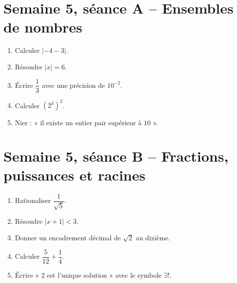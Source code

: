 \section{Semaine 5, séance A -- Ensembles de nombres}
\begin{enumerate}
  \item Calculer $|{-4}-3|$.
  \item Résoudre $|x|=6$.
  \item Écrire $\dfrac13$ avec une précision de $10^{-2}$.
  \item Calculer $(2^3)^2$.
  \item Nier : « il existe un entier pair supérieur à $10$ ».
\end{enumerate}

\section{Semaine 5, séance B -- Fractions, puissances et racines}
\begin{enumerate}
  \item Rationaliser $\dfrac1{\sqrt5}$.
  \item Résoudre $|x+1|<3$.
  \item Donner un encadrement décimal de $\sqrt2$ au dixième.
  \item Calculer $\dfrac{5}{12}+\dfrac14$.
  \item Écrire « $2$ est l'unique solution » avec le symbole $\exists!$.
\end{enumerate}
\TeacherOnly{%
\begin{tcolorbox}[colback=VE!3,colframe=VE!35,boxrule=.4pt,arc=1mm]
\small\textit{Réponses.}\quad \textbf{1.} $\dfrac{\sqrt5}{5}$. \quad \textbf{2.} $x\in]-4;2[$. \quad \textbf{3.} $1{,}4<\sqrt2<1{,}5$. \quad \textbf{4.} $\dfrac23$. \quad \textbf{5.} $\exists!x,\ x=2$.
\end{tcolorbox}}

